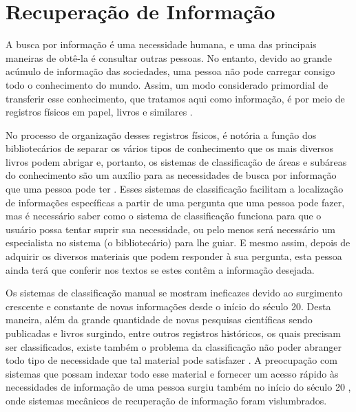 \section{Recuperação de Informação} \label{sec:RecuperaçãoInformação}



    A busca por informação é uma necessidade humana, e uma das principais maneiras de obtê-la é consultar outras pessoas.
    No entanto, devido ao grande acúmulo de informação das sociedades, uma pessoa não pode carregar consigo todo o conhecimento do mundo.
    Assim, um modo considerado primordial de transferir esse conhecimento, que tratamos aqui como informação, é por meio de registros físicos em papel, livros e similares \cite[p.~1]{Grossman2004IRAH}.
    
    No processo de organização desses registros físicos, é notória a função dos bibliotecários de separar os vários tipos de conhecimento que os mais diversos livros podem abrigar e, portanto, os sistemas de classificação de áreas e subáreas do conhecimento são um auxílio para as necessidades de busca por informação que uma pessoa pode ter \cite[p.~1]{Manning2008IIR} \cite[p.~1446]{Sanderson2012THIRR} \cite[p.~6]{Baeza-Yates1999}. 
    Esses sistemas de classificação facilitam a localização de informações específicas a partir de uma pergunta que uma pessoa pode fazer, mas é necessário saber como o sistema de classificação funciona para que o usuário possa tentar suprir sua necessidade, ou pelo menos será necessário um especialista no sistema (o bibliotecário) para lhe guiar.
    E mesmo assim, depois de adquirir os diversos materiais que podem responder à sua pergunta, esta pessoa ainda terá que conferir nos textos se estes contêm a informação desejada.
    
    
    Os sistemas de classificação manual se mostram ineficazes devido ao surgimento crescente e constante de novas informações \cite[p.~6]{Baeza-Yates1999} desde o início do século 20. 
    Desta maneira, além da grande quantidade de novas pesquisas científicas sendo publicadas e livros surgindo, entre outros registros históricos, os quais precisam ser classificados, existe também o problema da classificação não poder abranger todo tipo de necessidade que tal material pode satisfazer \cite[p.~1444]{Sanderson2012THIRR}. 
    A preocupação com sistemas que possam indexar todo esse material e fornecer um acesso rápido às necessidades de informação de uma pessoa surgiu também no início do século 20 \cite{Bush:1979:WMT:1113634.1113638}, onde sistemas mecânicos de recuperação de informação foram vislumbrados.
    
